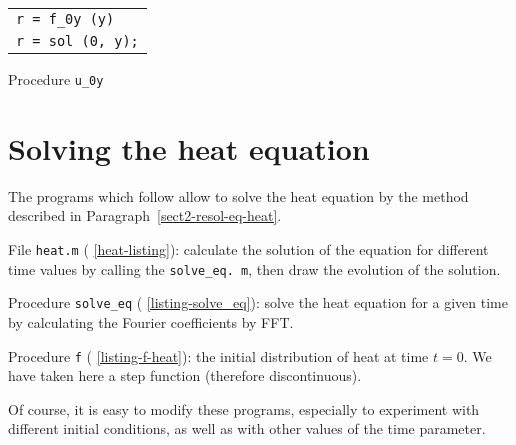 \begin{listing} \begin{footnotesize}
\noindent
{\upshape
\begin{tabular}{l} \texttt{\pfunction r = f\_0y (y)} \\
\texttt{r = sol (0, y);} \\
\end{tabular}
}
\noindent \end{footnotesize}
\caption{Procedure \texttt{\upshape u\_0y}}
\label{listing-u_0y}
\end{listing}
 
\section{Solving the heat equation}
\label{sect1-listing-heat}
 
The programs which follow allow to solve the heat equation by the method described in Paragraph~\ref{sect2-resol-eq-heat}. \begin{rs}
\item File \texttt{heat.m} (\listingterme{} \ref{heat-listing}): calculate the solution of the equation for different time values by calling the \listingterme{} \texttt{solve\_eq. m}, then draw the evolution of the solution.
\item Procedure \texttt{solve\_eq} (\listingterme{} \ref{listing-solve_eq}): solve the heat equation for a given time by calculating the Fourier coefficients by FFT.
\item Procedure \texttt{f} (\listingterme{} \ref{listing-f-heat}): the initial distribution of heat at time $ t = 0 $. We have taken here a step function (therefore discontinuous).
\end{rs} Of course, it is easy to modify these programs, especially to experiment with different initial conditions, as well as with other values of the time parameter.

